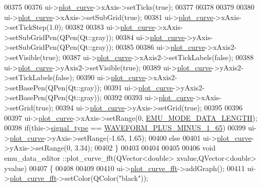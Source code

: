 \begin{DoxyCode}
00375 
00376   ui->\hyperlink{a00026_a1d46308dee8db7e3c99af65f13055479}{plot\_curve}->xAxis->setTicks(\textcolor{keyword}{true});
00377 
00378 
00379 
00380   ui->\hyperlink{a00026_a1d46308dee8db7e3c99af65f13055479}{plot\_curve}->xAxis->setSubGrid(\textcolor{keyword}{true});
00381   ui->\hyperlink{a00026_a1d46308dee8db7e3c99af65f13055479}{plot\_curve}->xAxis->setTickStep(1.0);
00382 
00383   ui->\hyperlink{a00026_a1d46308dee8db7e3c99af65f13055479}{plot\_curve}->xAxis->setSubGridPen(QPen(Qt::gray));
00384   ui->\hyperlink{a00026_a1d46308dee8db7e3c99af65f13055479}{plot\_curve}->yAxis->setSubGridPen(QPen(Qt::gray));
00385 
00386   ui->\hyperlink{a00026_a1d46308dee8db7e3c99af65f13055479}{plot\_curve}->xAxis2->setVisible(\textcolor{keyword}{true});
00387   ui->\hyperlink{a00026_a1d46308dee8db7e3c99af65f13055479}{plot\_curve}->xAxis2->setTickLabels(\textcolor{keyword}{false});
00388   ui->\hyperlink{a00026_a1d46308dee8db7e3c99af65f13055479}{plot\_curve}->yAxis2->setVisible(\textcolor{keyword}{true});
00389   ui->\hyperlink{a00026_a1d46308dee8db7e3c99af65f13055479}{plot\_curve}->yAxis2->setTickLabels(\textcolor{keyword}{false});
00390   ui->\hyperlink{a00026_a1d46308dee8db7e3c99af65f13055479}{plot\_curve}->xAxis2->setBasePen(QPen(Qt::gray));
00391   ui->\hyperlink{a00026_a1d46308dee8db7e3c99af65f13055479}{plot\_curve}->yAxis2->setBasePen(QPen(Qt::gray));
00392 
00393    ui->\hyperlink{a00026_a1d46308dee8db7e3c99af65f13055479}{plot\_curve}->xAxis->setGrid(\textcolor{keyword}{true});
00394    ui->\hyperlink{a00026_a1d46308dee8db7e3c99af65f13055479}{plot\_curve}->yAxis->setGrid(\textcolor{keyword}{true});
00395 
00396 
00397   ui->\hyperlink{a00026_a1d46308dee8db7e3c99af65f13055479}{plot\_curve}->xAxis->setRange(0, \hyperlink{a00003_af4c3a8ad94feb4d7bda7f107f34baf41}{EMU\_MODE\_DATA\_LENGTH});
00398   \textcolor{keywordflow}{if}(this->\hyperlink{a00004_a070edaec5aee6ba1f5a6866bc32c8ce4}{signal\_type} == \hyperlink{a00034_a0923d3b365a36e1e8c401cec964aa36f}{WAVEFORM\_PLUS\_MINUS\_1\_65})
00399   ui->\hyperlink{a00026_a1d46308dee8db7e3c99af65f13055479}{plot\_curve}->yAxis->setRange(-1.65, 1.65);
00400   \textcolor{keywordflow}{else}
00401   ui->\hyperlink{a00026_a1d46308dee8db7e3c99af65f13055479}{plot\_curve}->yAxis->setRange(0, 3.34);
00402 \}
00403 
00404 
00405 
00406 \textcolor{keywordtype}{void} emu\_data\_editor ::plot\_curve\_fft(QVector<double> xvalue,QVector<double> yvalue)
00407 \{
00408 
00409 
00410   ui->\hyperlink{a00026_a2bdf46ca3b702151408e6f6bd96b3228}{plot\_curve\_fft}->addGraph();
00411   ui->\hyperlink{a00026_a2bdf46ca3b702151408e6f6bd96b3228}{plot\_curve\_fft}->setColor(QColor(\textcolor{stringliteral}{"black"}));

\end{DoxyCode}
